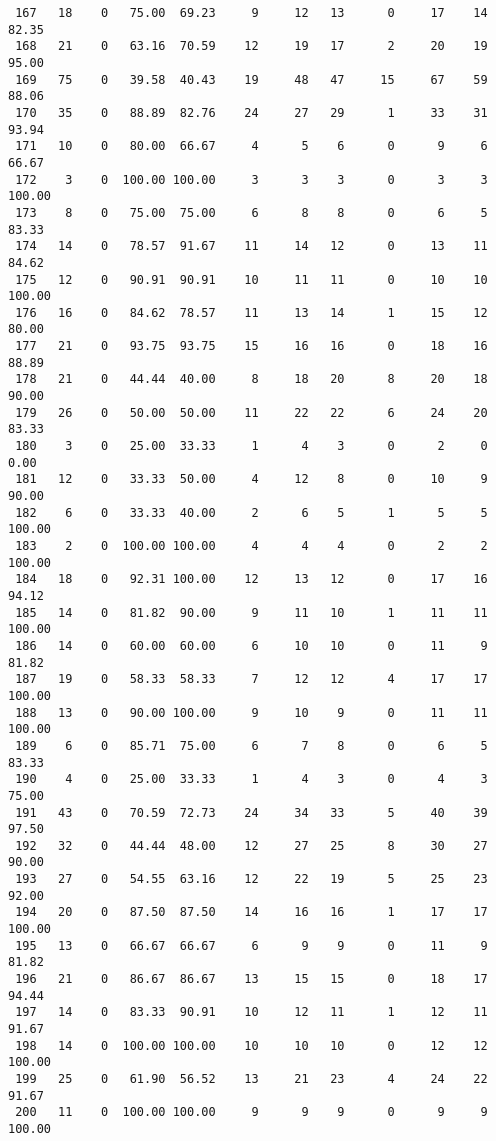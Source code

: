 \begin{verbatim}
 167   18    0   75.00  69.23     9     12   13      0     17    14    82.35
 168   21    0   63.16  70.59    12     19   17      2     20    19    95.00
 169   75    0   39.58  40.43    19     48   47     15     67    59    88.06
 170   35    0   88.89  82.76    24     27   29      1     33    31    93.94
 171   10    0   80.00  66.67     4      5    6      0      9     6    66.67
 172    3    0  100.00 100.00     3      3    3      0      3     3   100.00
 173    8    0   75.00  75.00     6      8    8      0      6     5    83.33
 174   14    0   78.57  91.67    11     14   12      0     13    11    84.62
 175   12    0   90.91  90.91    10     11   11      0     10    10   100.00
 176   16    0   84.62  78.57    11     13   14      1     15    12    80.00
 177   21    0   93.75  93.75    15     16   16      0     18    16    88.89
 178   21    0   44.44  40.00     8     18   20      8     20    18    90.00
 179   26    0   50.00  50.00    11     22   22      6     24    20    83.33
 180    3    0   25.00  33.33     1      4    3      0      2     0     0.00
 181   12    0   33.33  50.00     4     12    8      0     10     9    90.00
 182    6    0   33.33  40.00     2      6    5      1      5     5   100.00
 183    2    0  100.00 100.00     4      4    4      0      2     2   100.00
 184   18    0   92.31 100.00    12     13   12      0     17    16    94.12
 185   14    0   81.82  90.00     9     11   10      1     11    11   100.00
 186   14    0   60.00  60.00     6     10   10      0     11     9    81.82
 187   19    0   58.33  58.33     7     12   12      4     17    17   100.00
 188   13    0   90.00 100.00     9     10    9      0     11    11   100.00
 189    6    0   85.71  75.00     6      7    8      0      6     5    83.33
 190    4    0   25.00  33.33     1      4    3      0      4     3    75.00
 191   43    0   70.59  72.73    24     34   33      5     40    39    97.50
 192   32    0   44.44  48.00    12     27   25      8     30    27    90.00
 193   27    0   54.55  63.16    12     22   19      5     25    23    92.00
 194   20    0   87.50  87.50    14     16   16      1     17    17   100.00
 195   13    0   66.67  66.67     6      9    9      0     11     9    81.82
 196   21    0   86.67  86.67    13     15   15      0     18    17    94.44
 197   14    0   83.33  90.91    10     12   11      1     12    11    91.67
 198   14    0  100.00 100.00    10     10   10      0     12    12   100.00
 199   25    0   61.90  56.52    13     21   23      4     24    22    91.67
 200   11    0  100.00 100.00     9      9    9      0      9     9   100.00

\end{verbatim}
